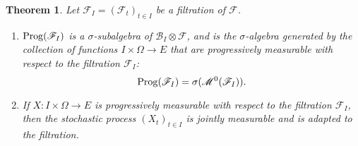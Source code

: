 \documentclass{article}
\newcommand{\Prog}{\ensuremath\mathrm{Prog}}
\theoremstyle{plain}
\newtheorem{theorem}{Theorem}
\theoremstyle{definition}
\begin{document}
\begin{theorem}
Let $\mathscr{F}_I=(\mathscr{F}_t)_{t \in I}$ be a filtration of $\mathscr{F}$.
\begin{enumerate}
\item $\Prog(\mathscr{F}_I)$ is a $\sigma$-subalgebra of $\mathscr{B}_I \otimes \mathscr{F}$, and  is the
$\sigma$-algebra generated by the collection of functions $I \times \Omega \to E$ that 
are progressively measurable with respect to the filtration $\mathscr{F}_I$:
\[
\Prog(\mathscr{F}_I)=\sigma(\mathscr{M}^0(\mathscr{F}_I)).
\]
\item If $X:I \times \Omega \to E$ is progressively measurable with respect to the filtration
$\mathscr{F}_I$, then the stochastic process $(X_t)_{t \in I}$ is jointly measurable and is adapted to the filtration.
\end{enumerate}
\end{theorem}
\end{document}
